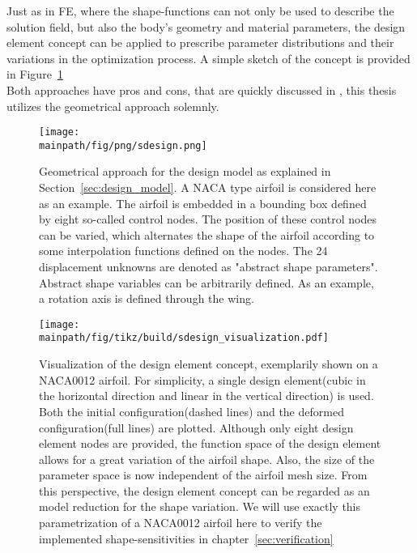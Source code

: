 \documentclass[../main.tex]{subfiles}
\begin{document}
Just as in \acf{FE}, where the shape-functions can not only be used to describe the solution field, but also the body's geometry and material parameters, the design element concept can be applied to prescribe parameter distributions and their variations in the optimization process. A simple sketch of the concept is provided in Figure~\ref{fig:sketch_geometrical_approach}
\\
Both approaches have pros and cons, that are quickly discussed in \cite{Maute2003}, this thesis utilizes the geometrical approach solemnly.

\begin{figure}[h!]
	\begin{center}
        \texttt{[image: \\mainpath/fig/png/sdesign.png]}
        \caption[Design-model: geometric approach]{Geometrical approach for the design model as explained in Section~\ref{sec:design_model}. A NACA type airfoil is considered here as an example. The airfoil is embedded in a bounding box defined by eight so-called control nodes. The position of these control nodes can be varied, which alternates the shape of the airfoil according to some interpolation functions defined on the nodes. The 24 displacement unknowns are denoted as "abstract shape parameters". Abstract shape variables can be arbitrarily defined. As an example, a rotation axis is defined through the wing.}
		\label{fig:sketch_geometrical_approach}
    \end{center}
\end{figure}

\begin{figure}[h!]
	\begin{center}
        \texttt{[image: \\mainpath/fig/tikz/build/sdesign\_visualization.pdf]}
        \caption[Design element visualization]{Visualization of the design element concept, exemplarily shown on a NACA0012 airfoil. For simplicity, a single design element(cubic in the horizontal direction and linear in the vertical direction) is used. Both the initial configuration(dashed lines) and the deformed configuration(full lines) are plotted. Although only eight design element nodes are provided, the function space of the design element allows for a great variation of the airfoil shape. Also, the size of the parameter space is now independent of the airfoil mesh size. From this perspective, the design element concept can be regarded as an model reduction for the shape variation. We will use exactly this parametrization of a NACA0012 airfoil here to verify the implemented shape-sensitivities in chapter~\ref{sec:verification}}
		\label{designelement_concept_2D}
    \end{center}
\end{figure}
\end{document}
